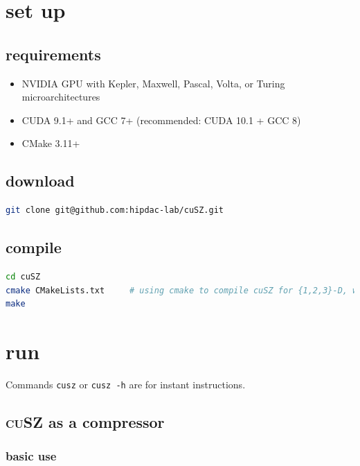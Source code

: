 \section{set up}

\subsection{requirements}

\begin{itemize}
\tightlist
\item
  NVIDIA GPU with Kepler, Maxwell, Pascal, Volta, or Turing
  microarchitectures
\item
  CUDA 9.1+ and GCC 7+ (recommended: CUDA 10.1 + GCC 8)
\item
  CMake 3.11+
\end{itemize}

\subsection{download}

\begin{lstlisting}[language=bash]
git clone git@github.com:hipdac-lab/cuSZ.git
\end{lstlisting}

\subsection{compile}

\begin{lstlisting}[language=bash]
cd cuSZ
cmake CMakeLists.txt     # using cmake to compile cuSZ for {1,2,3}-D, with Huffman codec
make
\end{lstlisting}

\section{run}

Commands \passthrough{\lstinline!cusz!} or
\passthrough{\lstinline!cusz -h!} are for instant instructions.

\subsection{\texorpdfstring{\textsc{cuSZ} as a
compressor}{ as a compressor}}

\subsubsection{basic use}

